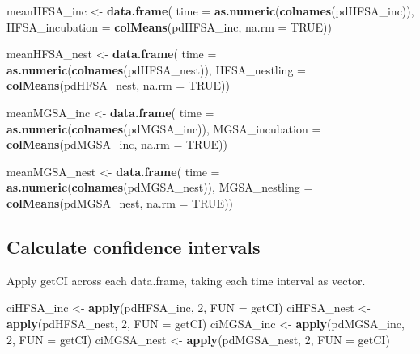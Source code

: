\documentclass[]{article}
\newenvironment{Shaded}{\begin{snugshade}}{\end{snugshade}}
\newcommand{\DataTypeTok}[1]{\textcolor[rgb]{0.13,0.29,0.53}{#1}}
\newcommand{\DecValTok}[1]{\textcolor[rgb]{0.00,0.00,0.81}{#1}}
\newcommand{\KeywordTok}[1]{\textcolor[rgb]{0.13,0.29,0.53}{\textbf{#1}}}
\newcommand{\NormalTok}[1]{#1}
\newcommand{\OtherTok}[1]{\textcolor[rgb]{0.56,0.35,0.01}{#1}}
\newcommand{\StringTok}[1]{\textcolor[rgb]{0.31,0.60,0.02}{#1}}
\begin{document}
\begin{Shaded}
\begin{Highlighting}[]
\NormalTok{meanHFSA_inc <-}\StringTok{ }\KeywordTok{data.frame}\NormalTok{(}
  \DataTypeTok{time =} \KeywordTok{as.numeric}\NormalTok{(}\KeywordTok{colnames}\NormalTok{(pdHFSA_inc)),}
  \DataTypeTok{HFSA_incubation =} \KeywordTok{colMeans}\NormalTok{(pdHFSA_inc, }\DataTypeTok{na.rm =} \OtherTok{TRUE}\NormalTok{))}

\NormalTok{meanHFSA_nest <-}\StringTok{ }\KeywordTok{data.frame}\NormalTok{(}
  \DataTypeTok{time =} \KeywordTok{as.numeric}\NormalTok{(}\KeywordTok{colnames}\NormalTok{(pdHFSA_nest)),}
  \DataTypeTok{HFSA_nestling =} \KeywordTok{colMeans}\NormalTok{(pdHFSA_nest, }\DataTypeTok{na.rm =} \OtherTok{TRUE}\NormalTok{))}

\NormalTok{meanMGSA_inc <-}\StringTok{ }\KeywordTok{data.frame}\NormalTok{(}
  \DataTypeTok{time =} \KeywordTok{as.numeric}\NormalTok{(}\KeywordTok{colnames}\NormalTok{(pdMGSA_inc)),}
  \DataTypeTok{MGSA_incubation =} \KeywordTok{colMeans}\NormalTok{(pdMGSA_inc, }\DataTypeTok{na.rm =} \OtherTok{TRUE}\NormalTok{))}

\NormalTok{meanMGSA_nest <-}\StringTok{ }\KeywordTok{data.frame}\NormalTok{(}
  \DataTypeTok{time =} \KeywordTok{as.numeric}\NormalTok{(}\KeywordTok{colnames}\NormalTok{(pdMGSA_nest)),}
  \DataTypeTok{MGSA_nestling =} \KeywordTok{colMeans}\NormalTok{(pdMGSA_nest, }\DataTypeTok{na.rm =} \OtherTok{TRUE}\NormalTok{))}
\end{Highlighting}
\end{Shaded}

\hypertarget{calculate-confidence-intervals-1}{%
\subsection{Calculate confidence
intervals}\label{calculate-confidence-intervals-1}}

Apply getCI across each data.frame, taking each time interval as vector.

\begin{Shaded}
\begin{Highlighting}[]
\NormalTok{ciHFSA_inc <-}\StringTok{ }\KeywordTok{apply}\NormalTok{(pdHFSA_inc, }\DecValTok{2}\NormalTok{, }\DataTypeTok{FUN =}\NormalTok{ getCI)}
\NormalTok{ciHFSA_nest <-}\StringTok{ }\KeywordTok{apply}\NormalTok{(pdHFSA_nest, }\DecValTok{2}\NormalTok{, }\DataTypeTok{FUN =}\NormalTok{ getCI)}
\NormalTok{ciMGSA_inc <-}\StringTok{ }\KeywordTok{apply}\NormalTok{(pdMGSA_inc, }\DecValTok{2}\NormalTok{, }\DataTypeTok{FUN =}\NormalTok{ getCI)}
\NormalTok{ciMGSA_nest <-}\StringTok{ }\KeywordTok{apply}\NormalTok{(pdMGSA_nest, }\DecValTok{2}\NormalTok{, }\DataTypeTok{FUN =}\NormalTok{ getCI)}
\end{Highlighting}
\end{Shaded}
\end{document}
